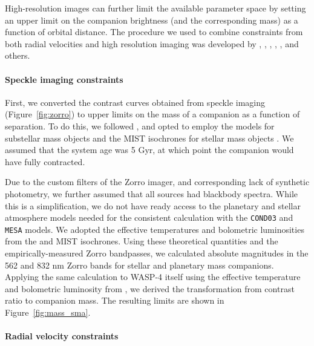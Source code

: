 \documentclass[12pt,twocolumn,tighten,trackchanges]{aastex62}
\begin{document}
High-resolution images can further limit the available parameter space
by setting an upper limit on the companion brightness (and the
corresponding mass) as a function of orbital distance.  The procedure
we used to combine constraints from both radial velocities and high
resolution imaging was developed by \citet{wright_linear_trends_2007},
\citet{crepp_trends_2012}, \citet{montet_trends_2014},
\citet{knutson_friends_2014},
\citet{bryan_statistics_2016,bryan_excess_2019}, and others.

\paragraph{Speckle imaging constraints}

First, we converted the contrast curves obtained from speckle imaging
(Figure~\ref{fig:zorro}) to upper limits on the mass of a companion as
a function of separation. To do this, we followed
\citet{montet_trends_2014}, and opted to employ the
\citet{baraffe_evolutionary_2003} models for substellar mass objects
and the MIST isochrones for stellar mass objects
\citep{paxton_modules_2011,paxton_modules_2013,paxton_modules_2015,dotter_mesa_2016,choi_mesa_2016}.
We assumed that the system age was 5 Gyr, at which point the companion
would have fully contracted.

Due to the custom filters of the Zorro imager, and corresponding lack
of synthetic photometry, we further assumed that all sources had
blackbody spectra. While this is a simplification, we do not have
ready access to the planetary and stellar atmosphere models needed for
the consistent calculation with the \texttt{COND03} and \texttt{MESA}
models.  We adopted the effective temperatures and bolometric
luminosities from the \citet{baraffe_evolutionary_2003} and MIST
isochrones.  Using these theoretical quantities and the
empirically-measured Zorro bandpasses, we calculated absolute
magnitudes in the 562 and 832 nm Zorro bands for stellar and planetary
mass companions.  Applying the same calculation to WASP-4 itself using
the effective temperature and bolometric luminosity from
, we derived the transformation from
contrast ratio to companion mass.  The resulting limits are shown in
Figure~\ref{fig:mass_sma}.

\paragraph{Radial velocity constraints}
\end{document}
